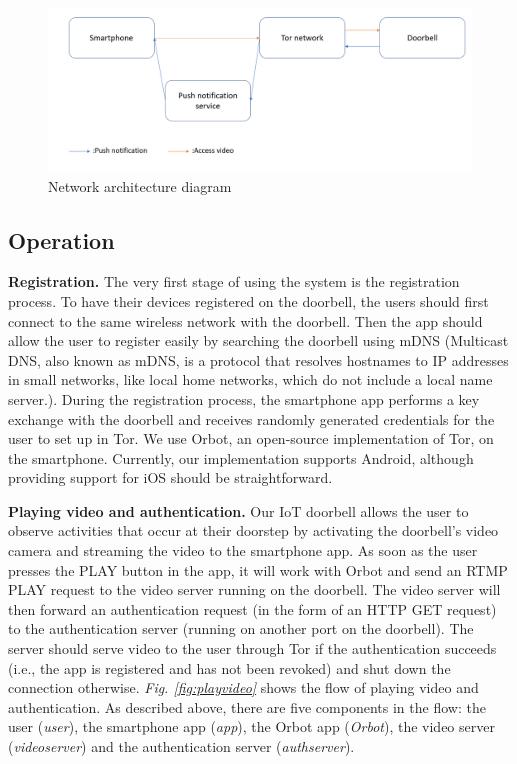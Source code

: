 \begin{figure}
	\includegraphics[width=\linewidth]{architecture.png}
	\caption{Network architecture diagram}
	\label{fig:architecture}
\end{figure}

\subsection{Operation}

\textbf{Registration.} The very first stage of using the system is the registration process. To have their devices registered on the doorbell, the users should first connect to the same wireless network with the doorbell. Then the app should allow the user to register easily by searching the doorbell using mDNS (Multicast DNS, also known as mDNS, is a protocol that resolves hostnames to IP addresses in small networks, like local home networks, which do not include a local name server.). During the registration process, the smartphone app performs a key exchange with the doorbell and receives randomly generated credentials for the user to set up in Tor. We use Orbot, an open-source implementation of Tor, on the smartphone. Currently, our implementation supports Android, although providing support for iOS should be straightforward.

\textbf{Playing video and authentication.} Our IoT doorbell allows the user to observe activities that occur at their doorstep by activating the doorbell's video camera and streaming the video to the smartphone app. As soon as the user presses the PLAY button in the app, it will work with Orbot and send an RTMP PLAY request to the video server running on the doorbell. The video server will then forward an authentication request (in the form of an HTTP GET request) to the authentication server (running on another port on the doorbell). The server should serve video to the user through Tor if the authentication succeeds (i.e., the app is registered and has not been revoked) and shut down the connection otherwise.
\textit{Fig. \ref{fig:playvideo}} shows the flow of playing video and authentication. As described above, there are five components in the flow: the user (\textit{user}), the smartphone app (\textit{app}), the Orbot app (\textit{Orbot}), the video server (\textit{videoserver}) and the authentication server (\textit{authserver}).

